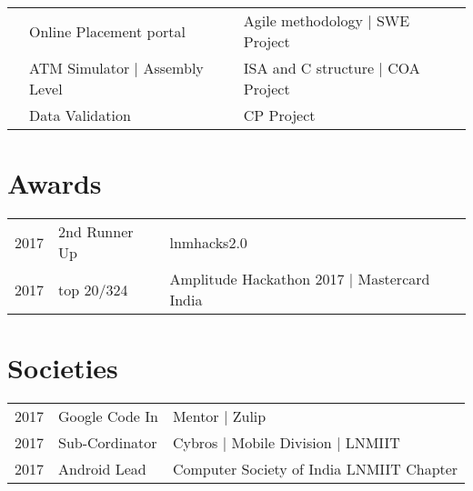 \documentclass[a4paper]{deedy-resume} %
\begin{document}
\begin{minipage}[t]{0.66\textwidth}

\sectionspace %

\begin{tabular}{rll}
\textbullet{}	 & Online Placement portal & Agile methodology | SWE Project\\
\textbullet{}	 & ATM Simulator | Assembly Level & ISA and C structure | COA Project\\
\textbullet{}	 & Data Validation & CP Project\\
\end{tabular}

\sectionspace %


\section{Awards}

\begin{tabular}{rll}
2017	 & 2nd Runner Up & lnmhacks2.0\\
2017	 & top 20/324 & Amplitude Hackathon 2017 | Mastercard India \\
\end{tabular}

\sectionspace %


\section{Societies}

\begin{tabular}{rll}
2017 & Google Code In & Mentor | Zulip\\
2017 & Sub-Cordinator & Cybros | Mobile Division | LNMIIT\\
2017 & Android Lead & Computer Society of India LNMIIT Chapter\\
\end{tabular}

\sectionspace %


\end{minipage} %
\end{document}
